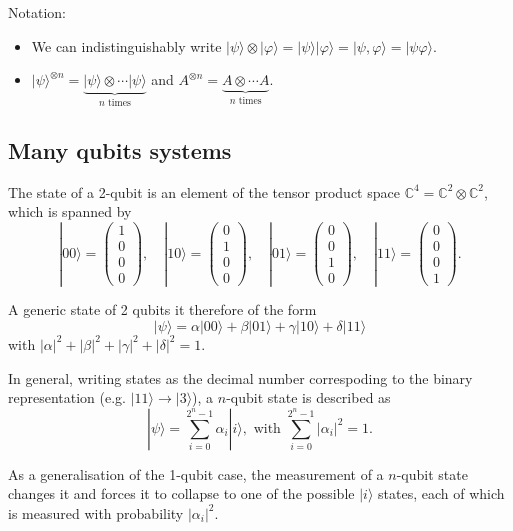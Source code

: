\documentclass[a4paper, 10pt]{article}
\numberwithin{equation}{section}
\numberwithin{figure}{section}
\numberwithin{table}{section}
\begin{document}
Notation:
\begin{itemize}
	\item We can indistinguishably write $|\psi\rangle \otimes |\varphi\rangle = |\psi\rangle|\varphi\rangle = |\psi,\varphi\rangle = |\psi\varphi\rangle$.
	\item $|\psi\rangle^{\otimes n} = \underbrace{|\psi\rangle \otimes \cdots |\psi\rangle}_{n \text{ times}}$ and $A^{\otimes n} = \underbrace{A \otimes \cdots A}_{n \text{ times}}$.
\end{itemize}


\subsection{Many qubits systems}

The state of a 2-qubit is an element of the tensor product space $\mathbb{C}^4 = \mathbb{C}^2 \otimes \mathbb{C}^2$, which is spanned by
$$|00\rangle = \begin{pmatrix}1\\0\\0\\0\end{pmatrix},\quad |10\rangle = \begin{pmatrix}0\\1\\0\\0\end{pmatrix},\quad |01\rangle = \begin{pmatrix}0\\0\\1\\0\end{pmatrix},\quad |11\rangle = \begin{pmatrix}0\\0\\0\\1\end{pmatrix}.$$

A generic state of 2 qubits it therefore of the form
$$ |\psi\rangle = \alpha|00\rangle + \beta|01\rangle + \gamma|10\rangle + \delta|11\rangle $$
with $|\alpha|^2+|\beta|^2+|\gamma|^2+|\delta|^2=1$.

In general, writing states as the decimal number correspoding to the binary representation (e.g. $|11\rangle \rightarrow |3\rangle$), a $n$-qubit state is described as
$$ |\psi\rangle = \sum_{i=0}^{2^n-1}\alpha_i|i\rangle, \text{ with } \sum_{i=0}^{2^n-1}|\alpha_i|^2=1. $$

As a generalisation of the 1-qubit case, the measurement of a $n$-qubit state changes it and forces it to collapse to one of the possible $|i\rangle$ states, each of which is measured with probability $|\alpha_i|^2$.
\end{document}
